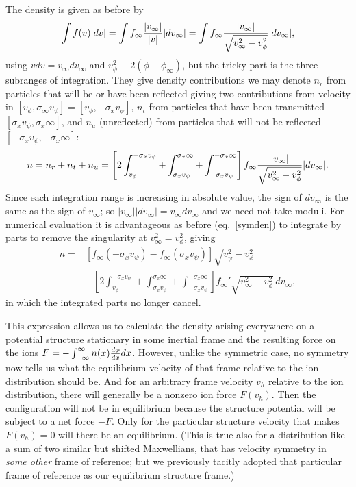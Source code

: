 \documentclass[12pt]{article}
\begin{document}
The density is given as before by 
\begin{equation}
\int f(v) |dv|=\int f_\infty {|v_\infty|\over |v|}   |dv_\infty| 
=\int  f_\infty {|v_\infty|\over \sqrt{v_\infty^2-v_\phi^2} }  |dv_\infty|, 
\end{equation}
using $vdv=v_\infty dv_\infty$ and
$v_\phi^2\equiv 2(\phi-\phi_\infty)$, but the tricky part is the three
subranges of integration. They give density contributions we may
denote $n_r$ from particles that will be or have been reflected giving two
contributions from
velocity in $[v_\phi,\sigma_\infty v_\psi]=[v_\phi,-\sigma_x v_\psi]$, $n_t$ from particles that have been
transmitted $[\sigma_xv_\psi,\sigma_x\infty]$, and $n_u$ (unreflected)
from particles that will not be reflected
$[-\sigma_xv_\psi,-\sigma_x\infty]$:
\begin{equation}
  n=n_r+n_t+n_u=\left[2\int_{v_\phi}^{-\sigma_x v_\psi}+\int_{\sigma_x v_\psi}^{\sigma_x\infty}
    +\int_{-\sigma_x v_\psi}^{-\sigma_x\infty}\right] 
  f_\infty {|v_\infty|\over \sqrt{v_\infty^2-v_\phi^2} }  |dv_\infty|.
\end{equation}
Since each integration range is increasing in absolute value, the sign
of $dv_\infty$ is the same as the sign of $v_\infty$; so
$|v_\infty||dv_\infty|= v_\infty dv_\infty$ and we need not take moduli.
For numerical evaluation it is advantageous as before (eq.\
\ref{symden}) to integrate by parts to
remove the singularity at $v_\infty^2=v_\phi^2$, giving 
\begin{equation}
\begin{split}
  n=&[f_\infty(-\sigma_xv_\psi)-f_\infty(\sigma_xv_\psi)]\sqrt{v_\psi^2-v_\phi^2}\\
  &-\left[2\int_{v_\phi}^{-\sigma_x v_\psi}+\int_{\sigma_x v_\psi}^{\sigma_x\infty}
    +\int_{-\sigma_x v_\psi}^{-\sigma_x\infty}\right]
  f_\infty'\sqrt{v_\infty^2-v_\phi^2}\, dv_\infty,
\end{split}
\end{equation}
in which the integrated parts no longer cancel.

This expression allows us to calculate the density arising everywhere
on a potential structure stationary in some inertial frame and the
resulting force on the ions
$F=-\int_{-\infty}^{\infty} n(x) {d\phi\over dx}dx$. However, unlike
the symmetric case, no symmetry now tells us what the equilibrium
velocity of that frame relative to the ion distribution should be. And
for an arbitrary frame velocity $v_h$ relative to the ion
distribution, there will generally be a nonzero ion force
$F(v_h)$. Then the configuration will not be in equilibrium because
the structure potential will be subject to a net force $-F$. Only for
the particular structure velocity that makes $F(v_h)=0$ will there be
an equilibrium.  (This is true also for a distribution like a sum of
two similar but shifted Maxwellians, that has velocity symmetry in
\emph{some other} frame of reference; but we previously tacitly
adopted that particular frame of reference as our equilibrium
structure frame.)
\end{document}
